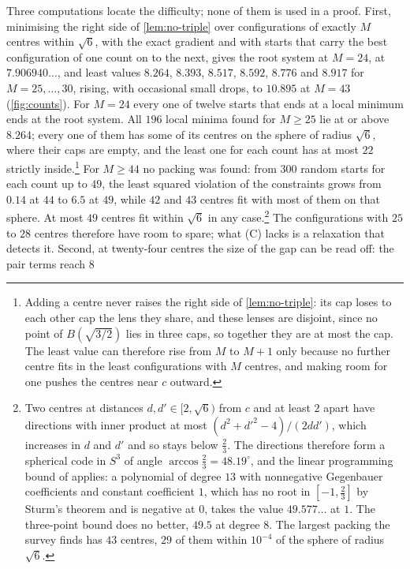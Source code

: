 \documentclass[11pt,reqno]{amsart}
\renewcommand{\_}{\origunderscore\allowbreak}
\numberwithin{equation}{section}
\theoremstyle{plain}
\theoremstyle{definition}
\theoremstyle{remark}
\begin{document}
Three computations locate the difficulty; none of them is used in a
proof. First, minimising the right side of \cref{lem:no-triple} over
configurations of exactly $M$ centres within $\sqrt6$, with the exact
gradient and with starts that carry the best configuration of one count
on to the next, gives the root system at $M=24$, at $7.906940\ldots$, and
least values $8.264$, $8.393$, $8.517$, $8.592$, $8.776$ and $8.917$ for
$M=25,\dots,30$, rising, with occasional small drops, to $10.895$ at $M=43$
(\cref{fig:counts}). For $M=24$ every one of twelve starts that ends at a
local minimum ends at the root system. All $196$ local minima found for
$M\ge25$ lie at or above $8.264$; every one of them has some of its centres
on the sphere of radius $\sqrt6$, where their caps are empty, and the least
one for each count has at most $22$ strictly inside.\footnote{Adding a
  centre never raises the right side of \cref{lem:no-triple}: its cap
  loses to each other cap the lens they share, and these lenses are
  disjoint, since no point of $B(\sqrt{3/2})$ lies in three caps, so
  together they are at most the cap. The least value can therefore rise
  from $M$ to $M+1$ only because no further centre fits in the least
  configurations with $M$ centres, and making room for one pushes the
  centres near $c$ outward.} For $M\ge44$ no packing was found: from $300$
random starts for each count up to $49$, the least squared violation of
the constraints grows from $0.14$ at $44$ to $6.5$ at $49$, while $42$ and
$43$ centres fit with most of them on that sphere. At most $49$ centres
fit within $\sqrt6$ in any case.\footnote{Two centres at distances
  $d,d'\in[2,\sqrt6)$ from $c$ and at least $2$ apart have directions with
  inner product at most $(d^2+d'^2-4)/(2dd')$, which increases in $d$ and
  $d'$ and so stays below $\frac23$. The directions therefore form a
  spherical code in $S^3$ of angle $\arccos\frac23=48.19^\circ$, and the
  linear programming bound of \cite{DGS77} applies: a polynomial of degree
  $13$ with nonnegative Gegenbauer coefficients and constant coefficient
  $1$, which has no root in $[-1,\frac23]$ by Sturm's theorem and is
  negative at $0$, takes the value $49.577\ldots$ at $1$. The three-point
  bound does no better, $49.5$ at degree $8$. The largest packing the
  survey finds has $43$ centres, $29$ of them within $10^{-4}$ of the
  sphere of radius $\sqrt6$.} The configurations with $25$ to $28$ centres therefore have room to spare;
what (C) lacks is a relaxation that detects it. Second, at twenty-four
centres the size of the gap can be read off: the pair terms reach $8$
\end{document}
